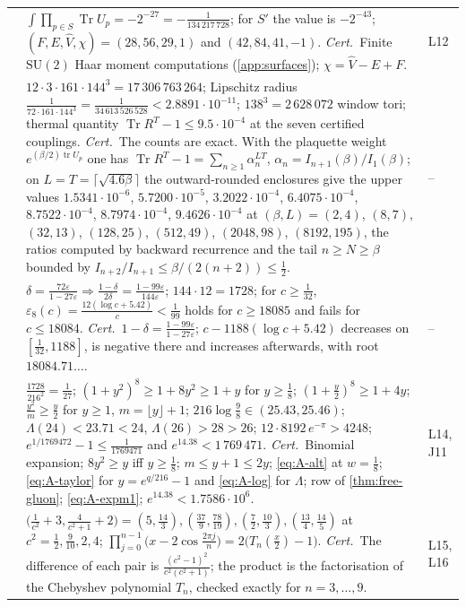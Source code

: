 \documentclass[11pt,a4paper]{amsart}
\theoremstyle{definition}
\theoremstyle{remark}
\numberwithin{equation}{section}
\DeclareMathOperator{\Tr}{Tr}        %
\DeclareMathOperator{\tr}{tr}        %
\newcommand{\SU}{\mathrm{SU}}              %
\begin{document}
{\begin{longtable}{@{}p{}p{}p{}@{}}
{thm:pseudoreality} & $\int\prod_{p\in S}\Tr U_p=-2^{-27}=-\frac1{134\,217\,728}$; for $S'$ the value is $-2^{-43}$; $(F,E,\hat V,\chi)=(28,56,29,1)$ and $(42,84,41,-1)$. \emph{Cert.}\ Finite $\SU(2)$ Haar moment computations (\cref{app:surfaces}); $\chi=\hat V-E+F$. & L12\\
{thm:finite-rank-obstruction} & $12\cdot3\cdot161\cdot144^3=17\,306\,763\,264$; Lipschitz radius $\frac1{72\cdot161\cdot144^3}=\frac1{34\,613\,526\,528}<2.8891\cdot10^{-11}$; $138^3=2\,628\,072$ window tori; thermal quantity $\Tr R^T-1\le9.5\cdot10^{-4}$ at the seven certified couplings. \emph{Cert.}\ The counts are exact. With the plaquette weight $e^{(\beta/2)\tr U_p}$ one has $\Tr R^T-1=\sum_{n\ge1}\alpha_n^{LT}$, $\alpha_n=I_{n+1}(\beta)/I_1(\beta)$; on $L=T=\lceil\sqrt{4.6\beta}\rceil$ the outward-rounded enclosures give the upper values $1.5341\cdot10^{-6}$, $5.7200\cdot10^{-5}$, $3.2022\cdot10^{-4}$, $6.4075\cdot10^{-4}$, $8.7522\cdot10^{-4}$, $8.7974\cdot10^{-4}$, $9.4626\cdot10^{-4}$ at $(\beta,L)=(2,4)$, $(8,7)$, $(32,13)$, $(128,25)$, $(512,49)$, $(2048,98)$, $(8192,195)$, the ratios computed by backward recurrence and the tail $n\ge N\ge\beta$ bounded by $I_{n+2}/I_{n+1}\le\beta/(2(n+2))\le\frac12$. & --\\
{prop:trivialising-maps} & $\delta=\frac{72\varepsilon}{1-27\varepsilon}\Rightarrow\frac{1-\delta}{2\delta}=\frac{1-99\varepsilon}{144\varepsilon}$; $144\cdot12=1728$; for $c\ge\frac1{32}$, $\varepsilon_8(c)=\frac{12(\log c+5.42)}c<\frac1{99}$ holds for $c\ge18085$ and fails for $c\le18084$. \emph{Cert.}\ $1-\delta=\frac{1-99\varepsilon}{1-27\varepsilon}$; $c-1188(\log c+5.42)$ decreases on $[\frac1{32},1188]$, is negative there and increases afterwards, with root $18084.71\ldots$. & --\\
{thm:universal-step} & $\frac{1728}{216^2}=\frac1{27}$; $(1+y^2)^8\ge1+8y^2\ge1+y$ for $y\ge\frac18$; $(1+\frac y2)^8\ge1+4y$; $\frac{y^2}m\ge\frac y2$ for $y\ge1$, $m=\lfloor y\rfloor+1$; $216\log\frac98\in(25.43,25.46)$; $\Lambda(24)<23.71<24$, $\Lambda(26)>28>26$; $12\cdot8192\,e^{-\pi}>4248$; $e^{1/1769472}-1\le\frac1{1769471}$ and $e^{14.38}<1\,769\,471$. \emph{Cert.}\ Binomial expansion; $8y^2\ge y$ iff $y\ge\frac18$; $m\le y+1\le2y$; \eqref{eq:A-alt} at $w=\frac18$; \eqref{eq:A-taylor} for $y=e^{q/216}-1$ and \eqref{eq:A-log} for $\Lambda$; row of \cref{thm:free-gluon}; \eqref{eq:A-expm1}; $e^{14.38}<1.7586\cdot10^6$. & L14, J11\\
{thm:non-implication} & $\bigl(\frac1{c^2}+3,\frac4{c^2+1}+2\bigr)=(5,\frac{14}3),(\frac{37}9,\frac{78}{19}),(\frac72,\frac{10}3),(\frac{13}4,\frac{14}5)$ at $c^2=\frac12,\frac9{10},2,4$; $\prod_{j=0}^{n-1}\bigl(x-2\cos\frac{2\pi j}n\bigr)=2\bigl(T_n(\frac x2)-1\bigr)$. \emph{Cert.}\ The difference of each pair is $\frac{(c^2-1)^2}{c^2(c^2+1)}$; the product is the factorisation of the Chebyshev polynomial $T_n$, checked exactly for $n=3,\dots,9$. & L15, L16\\

\end{longtable}}
\end{document}

